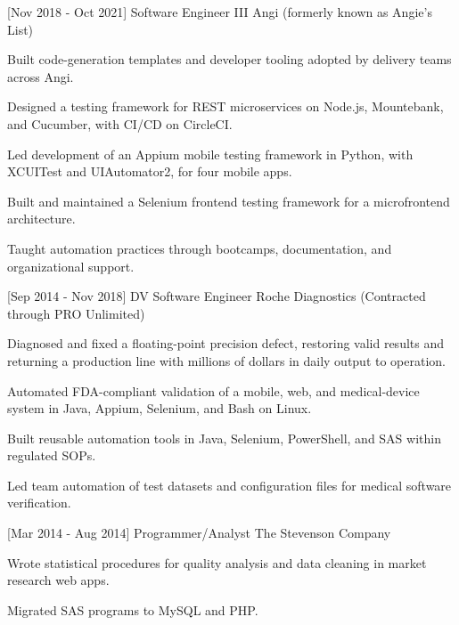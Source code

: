 \documentclass[]{moak-resume}
\begin{document}
 \begin{entrylist}
  \experienceentry
    {[Nov 2018 - Oct 2021]}
    {Software Engineer III}
    {Angi (formerly known as Angie's List)}
    {}
\end{entrylist}
\begin{experienceitems}
  \item Built code-generation templates and developer tooling adopted by delivery teams across Angi.
  \item Designed a testing framework for REST microservices on Node.js, Mountebank, and Cucumber, with CI/CD on CircleCI.
  \item Led development of an Appium mobile testing framework in Python, with XCUITest and UIAutomator2, for four mobile apps.
  \item Built and maintained a Selenium frontend testing framework for a microfrontend architecture.
  \item Taught automation practices through bootcamps, documentation, and organizational support.
\end{experienceitems}
\experiencegap

\begin{entrylist}
  \experienceentry
    {[Sep 2014 - Nov 2018]}
    {DV Software Engineer}
    {Roche Diagnostics (Contracted through PRO Unlimited)}
    {}
\end{entrylist}
\begin{experienceitems}
  \item Diagnosed and fixed a floating-point precision defect, restoring valid results and returning a production line with millions of dollars in daily output to operation.
  \item Automated FDA-compliant validation of a mobile, web, and medical-device system in Java, Appium, Selenium, and Bash on Linux.
  \item Built reusable automation tools in Java, Selenium, PowerShell, and SAS within regulated SOPs.
  \item Led team automation of test datasets and configuration files for medical software verification.
\end{experienceitems}
\experiencegap

\begin{entrylist}
  \experienceentry
    {[Mar 2014 - Aug 2014]}
    {Programmer/Analyst}
    {The Stevenson Company}
    {}
\end{entrylist}
\begin{experienceitems}
  \item Wrote statistical procedures for quality analysis and data cleaning in market research web apps.
  \item Migrated SAS programs to MySQL and PHP.
\end{experienceitems}
\experiencegap
\end{document}
